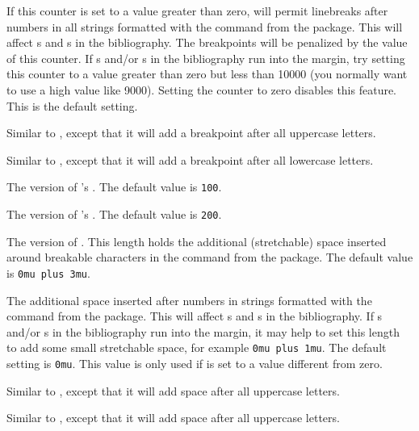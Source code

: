 \begin{ltxsyntax}
If this counter is set to a value greater than zero, \biblatex will permit linebreaks after numbers in all strings formatted with the  command from the  package. This will affect s and s in the bibliography. The breakpoints will be penalized by the value of this counter. If s and/or s in the bibliography run into the margin, try setting this counter to a value greater than zero but less than 10000 (you normally want to use a high value like 9000). Setting the counter to zero disables this feature. This is the default setting.


Similar to , except that it will add a breakpoint after all uppercase letters.


Similar to , except that it will add a breakpoint after all lowercase letters.


The  version of 's . The default value is \texttt{100}.


The  version of 's . The default value is \texttt{200}.


The  version of . This length holds the additional (stretchable) space inserted around breakable characters in the  command from the  package. The default value is \texttt{0mu plus 3mu}.


The additional space inserted after numbers in strings formatted with the  command from the  package. This will affect s and s in the bibliography. If s and/or s in the bibliography run into the margin, it may help to set this length to add some small stretchable space, for example \texttt{0mu plus 1mu}. The default setting is \texttt{0mu}. This value is only used if  is set to a value different from zero.


Similar to , except that it will add space after all uppercase letters.


Similar to , except that it will add space after all uppercase letters.
\end{ltxsyntax}

